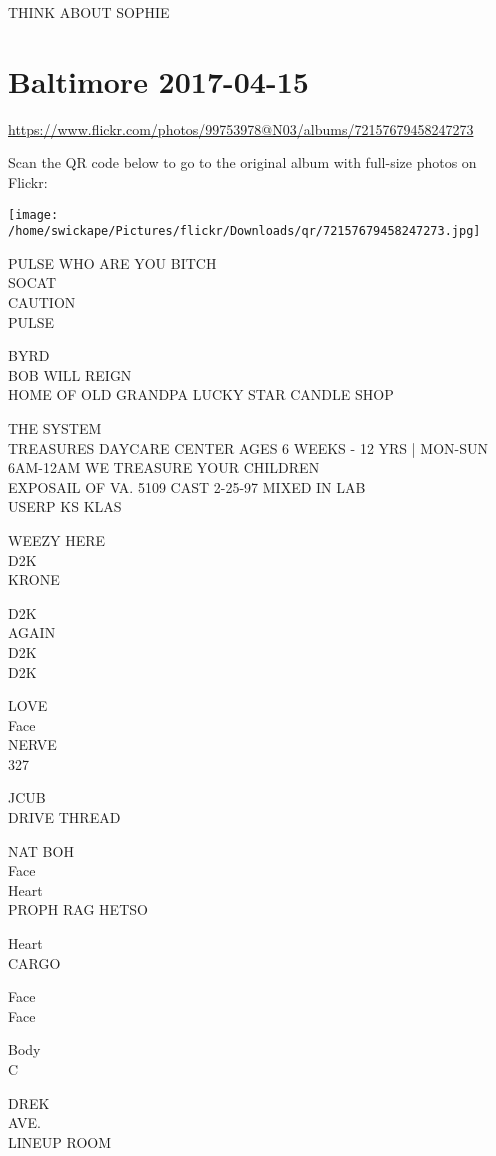 \documentclass[10pt,letterpaper]{article}
\begin{document}
THINK ABOUT SOPHIE
\pagebreak

\section*{Baltimore 2017-04-15}

\url{https://www.flickr.com/photos/99753978@N03/albums/72157679458247273}

Scan the QR code below to go to the original album with full-size photos on Flickr:

\texttt{[image: /home/swickape/Pictures/flickr/Downloads/qr/72157679458247273.jpg]}
\pagebreak

PULSE WHO ARE YOU BITCH\\
SOCAT\\
CAUTION\\
PULSE

BYRD\\
BOB WILL REIGN\\
HOME OF OLD GRANDPA LUCKY STAR CANDLE SHOP

THE SYSTEM\\
TREASURES DAYCARE CENTER AGES 6 WEEKS {-} 12 YRS | MON{-}SUN 6AM{-}12AM WE TREASURE YOUR CHILDREN\\
EXPOSAIL OF VA. 5109 CAST 2{-}25{-}97 MIXED IN LAB\\
USERP KS KLAS

WEEZY HERE\\
D2K\\
KRONE

D2K\\
AGAIN\\
D2K\\
D2K

LOVE\\
Face\\
NERVE\\
327

JCUB\\
DRIVE THREAD

NAT BOH\\
Face\\
Heart\\
PROPH RAG HETSO

Heart\\
CARGO

Face\\
Face

Body\\
C

DREK\\
AVE.\\
LINEUP ROOM
\end{document}
